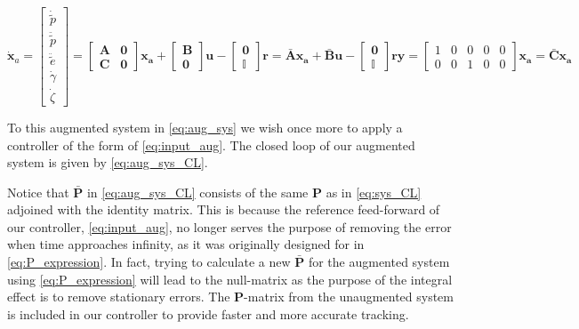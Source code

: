 \begin{subequations}\label{eq:aug_sys}
    \begin{equation}
        \mathbf{\dot{x}}_a = 
        \begin{bmatrix}
            \dot{\tilde{p}} \\ \ddot{\tilde{p}} \\ \ddot{\tilde{e}} \\ \dot{\gamma} \\ \dot{\zeta}
        \end{bmatrix}
        =
        \begin{bmatrix}
            \mathbf{A} & \mathbf{0} \\
            \mathbf{C} & \mathbf{0}
        \end{bmatrix}
        \mathbf{x_a} + 
        \begin{bmatrix} \mathbf{B} \\ \mathbf{0} \end{bmatrix}
        \mathbf{u} -
        \begin{bmatrix} \mathbf{0} \\ \mathbb{I} \end{bmatrix}\mathbf{r}
        = \mathbf{\bar{A}x_a + \bar{B}u} -
        \begin{bmatrix} \mathbf{0} \\ \mathbb{I} \end{bmatrix}
        \mathbf{r}
    \end{equation}
    
    \begin{equation}
        \mathbf{y} = 
        \begin{bmatrix}
            1 & 0 & 0 & 0 & 0 \\
            0 & 0 & 1 & 0 & 0
        \end{bmatrix}
        \mathbf{x_a} = \mathbf{\bar{C}x_a}
    \end{equation}
\end{subequations}



To this augmented system in \cref{eq:aug_sys} we wish once more to apply a controller of the form of \cref{eq:input_aug}. The closed loop of our augmented system is given by \cref{eq:aug_sys_CL}. 

Notice that $\mathbf{\bar{P}}$ in \cref{eq:aug_sys_CL} consists of the same $\mathbf{P}$ as in \cref{eq:sys_CL} adjoined with the identity matrix. This is because the reference feed-forward of our controller, \cref{eq:input_aug}, no longer serves the purpose of removing the error when time approaches infinity, as it was originally designed for in \cref{eq:P_expression}. In fact, trying to calculate a new $\mathbf{\bar{P}}$ for the augmented system using \cref{eq:P_expression} will lead to the null-matrix as the purpose of the integral effect is to remove stationary errors. The $\mathbf{P}$-matrix from the unaugmented system is included in our controller to provide faster and more accurate tracking.

